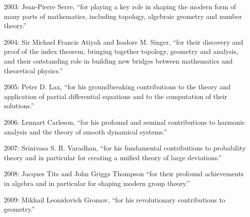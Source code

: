 \documentclass[12pt]{article}
\begin{document}
2003: Jean-Pierre Serre, ``for playing a key role in shaping the modern form of many parts of mathematics, including topology, algebraic geometry and number theory.''

2004: Sir Michael Francis Atiyah and Isadore M. Singer, ``for their discovery and proof of the index theorem, bringing together topology, geometry and analysis, and their outstanding role in building new bridges between mathematics and theoretical physics.''

2005: Peter D. Lax, ``for his groundbreaking contributions to the theory and application of partial differential equations and to the computation of their solutions.''

2006: Lennart Carleson, ``for his profound and seminal contributions to harmonic analysis and the theory of smooth dynamical systems.''

2007: Srinivasa S. R. Varadhan, ``for his fundamental contributions to probability theory and in particular for creating a unified theory of large deviations.''

2008: Jacques Tits and John Griggs Thompson ``for their profound achievements in algebra and in particular for shaping modern group theory.''

2009: Mikhail Leonidovich Gromov, ``for his revolutionary contributions to geometry.''

\end{document}
